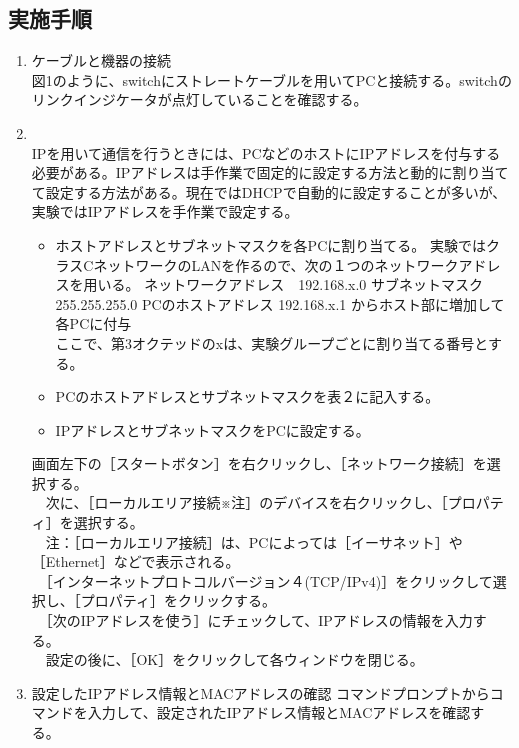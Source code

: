 \documentclass[10pt]{article}
\begin{document}
\subsection{実施手順}
\begin{enumerate}
    \item ケーブルと機器の接続 \\
            図1のように、switchにストレートケーブルを用いてPCと接続する。switchのリンクインジケータが点灯していることを確認する。 
    \item \\
        IPを用いて通信を行うときには、PCなどのホストにIPアドレスを付与する必要がある。IPアドレスは手作業で固定的に設定する方法と動的に割り当てて設定する方法がある。現在ではDHCPで自動的に設定することが多いが、実験ではIPアドレスを手作業で設定する。
        \begin{itemize}
            \item ホストアドレスとサブネットマスクを各PCに割り当てる。
                実験ではクラスCネットワークのLANを作るので、次の１つのネットワークアドレスを用いる。 ネットワークアドレス　192.168.x.0 サブネットマスク 255.255.255.0 PCのホストアドレス 192.168.x.1 からホスト部に増加して各PCに付与 \\ \text{*}ここで、第3オクテッドのxは、実験グループごとに割り当てる番号とする。
            \item PCのホストアドレスとサブネットマスクを表２に記入する。
            \item IPアドレスとサブネットマスクをPCに設定する。
        \end{itemize}
        画面左下の［スタートボタン］を右クリックし、［ネットワーク接続］を選択する。\\ 　次に、［ローカルエリア接続※注］のデバイスを右クリックし、［プロパティ］を選択する。\\ 　\text{*}注：［ローカルエリア接続］は、PCによっては［イーサネット］や［Ethernet］などで表示される。\\ 　［インターネットプロトコルバージョン４(TCP/IPv4)］をクリックして選択し、［プロパティ］をクリックする。\\ 　［次のIPアドレスを使う］にチェックして、IPアドレスの情報を入力する。\\ 　設定の後に、［OK］をクリックして各ウィンドウを閉じる。 \\
    \item 設定したIPアドレス情報とMACアドレスの確認
            コマンドプロンプトからコマンドを入力して、設定されたIPアドレス情報とMACアドレスを確認する。
            \begin{itemize}

\end{itemize}
\end{enumerate}
\end{document}
